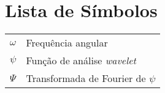 \documentclass[11pt,twoside,a4paper]{book}
\begin{document}
\chapter{Lista de Símbolos}
\begin{tabular}{ll}
        $\omega$    & Frequência angular\\
        $\psi$      & Função de análise \emph{wavelet}\\
        $\Psi$      & Transformada de Fourier de $\psi$\\
\end{tabular}

\listoffigures
\listoftables

\mainmatter

\fancyhead[RE,LO]{\thesection}

\singlespacing              %


\backmatter \singlespacing   %
\end{document}
